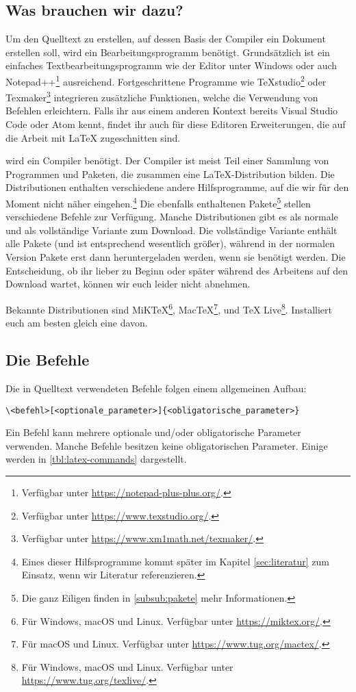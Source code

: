 \subsection{Was brauchen wir dazu?}
\label{sub:was_brauchen_wir_dazu}
Um den Quelltext zu erstellen, auf dessen Basis der Compiler ein Dokument erstellen soll, wird ein Bearbeitungsprogramm benötigt.
Grundsätzlich ist ein einfaches Textbearbeitungsprogramm wie der Editor unter Windows oder auch Notepad++\footnote{Verfügbar unter \url{https://notepad-plus-plus.org/}.} ausreichend.
Fortgeschrittene Programme wie TeXstudio\footnote{Verfügbar unter \url{https://www.texstudio.org/}.} oder Texmaker\footnote{Verfügbar unter \url{https://www.xm1math.net/texmaker/}.} integrieren zusätzliche Funktionen, welche die Verwendung von Befehlen erleichtern.
Falls ihr aus einem anderen Kontext bereits Visual Studio Code oder Atom kennt, findet ihr auch für diese Editoren Erweiterungen, die auf die Arbeit mit \LaTeX{} zugeschnitten sind.

 wird ein Compiler benötigt.
Der Compiler ist meist Teil einer Sammlung von Programmen und Paketen, die zusammen eine \LaTeX-Distribution bilden.
Die Distributionen enthalten verschiedene andere Hilfsprogramme, auf die wir für den Moment nicht näher eingehen.\footnote{Eines dieser Hilfsprogramme kommt später im Kapitel \ref{sec:literatur} zum Einsatz, wenn wir Literatur referenzieren.}
Die ebenfalls enthaltenen Pakete\footnote{Die ganz Eiligen finden in \cref{subsub:pakete} mehr Informationen.} stellen verschiedene Befehle zur Verfügung.
Manche Distributionen gibt es als normale und als vollständige Variante zum Download. 
Die vollständige Variante enthält alle Pakete (und ist entsprechend wesentlich größer), während in der normalen Version Pakete erst dann heruntergeladen werden, wenn sie benötigt werden.
Die Entscheidung, ob ihr lieber zu Beginn oder später während des Arbeitens auf den Download wartet, können wir euch leider nicht abnehmen.

Bekannte Distributionen sind MiK\TeX\footnote{Für Windows, macOS und Linux. Verfügbar unter \url{https://miktex.org/}.}, Mac\TeX\footnote{Für macOS und Linux. Verfügbar unter \url{https://www.tug.org/mactex/}.}, und \TeX{} Live\footnote{Für Windows, macOS und Linux. Verfügbar unter \url{https://www.tug.org/texlive/}.}.
Installiert euch am besten gleich eine davon.

\subsection{Die Befehle}
\label{sub:die_befehle}
Die in Quelltext verwendeten Befehle folgen einem allgemeinen Aufbau:
\begin{verbatim}
\<befehl>[<optionale_parameter>]{<obligatorische_parameter>}
\end{verbatim}
Ein Befehl kann mehrere optionale und/oder obligatorische Parameter verwenden. Manche Befehle besitzen keine obligatorischen Parameter. Einige werden in \cref{tbl:latex-commands} dargestellt.

